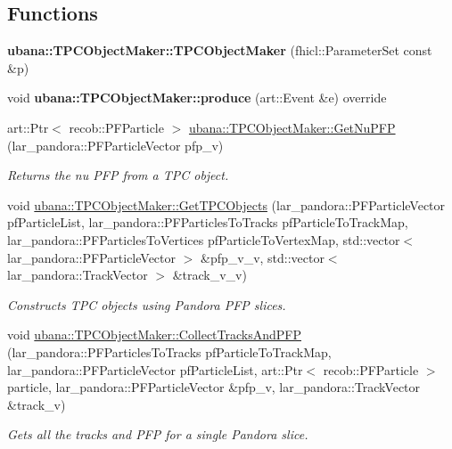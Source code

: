 \subsection*{Functions}
\begin{DoxyCompactItemize}
\item 
\hypertarget{group__UBXSec_gae030804e6aa4085bef6be52e9618fee9}{{\bfseries ubana\-::\-T\-P\-C\-Object\-Maker\-::\-T\-P\-C\-Object\-Maker} (fhicl\-::\-Parameter\-Set const \&p)}\label{group__UBXSec_gae030804e6aa4085bef6be52e9618fee9}

\item 
\hypertarget{group__UBXSec_ga07c03a811bbaccdbeb20b2b7714034c9}{void {\bfseries ubana\-::\-T\-P\-C\-Object\-Maker\-::produce} (art\-::\-Event \&e) override}\label{group__UBXSec_ga07c03a811bbaccdbeb20b2b7714034c9}

\item 
art\-::\-Ptr$<$ recob\-::\-P\-F\-Particle $>$ \hyperlink{group__UBXSec_ga6a47470b5f5690a3626e14bc9f6f360c}{ubana\-::\-T\-P\-C\-Object\-Maker\-::\-Get\-Nu\-P\-F\-P} (lar\-\_\-pandora\-::\-P\-F\-Particle\-Vector pfp\-\_\-v)
\begin{DoxyCompactList}\small\item\em Returns the nu P\-F\-P from a T\-P\-C object. \end{DoxyCompactList}\item 
void \hyperlink{group__UBXSec_gaf90fb2bf60601767e1db3bd1ca635433}{ubana\-::\-T\-P\-C\-Object\-Maker\-::\-Get\-T\-P\-C\-Objects} (lar\-\_\-pandora\-::\-P\-F\-Particle\-Vector pf\-Particle\-List, lar\-\_\-pandora\-::\-P\-F\-Particles\-To\-Tracks pf\-Particle\-To\-Track\-Map, lar\-\_\-pandora\-::\-P\-F\-Particles\-To\-Vertices pf\-Particle\-To\-Vertex\-Map, std\-::vector$<$ lar\-\_\-pandora\-::\-P\-F\-Particle\-Vector $>$ \&pfp\-\_\-v\-\_\-v, std\-::vector$<$ lar\-\_\-pandora\-::\-Track\-Vector $>$ \&track\-\_\-v\-\_\-v)
\begin{DoxyCompactList}\small\item\em Constructs T\-P\-C objects using Pandora P\-F\-P slices. \end{DoxyCompactList}\item 
void \hyperlink{group__UBXSec_ga39991fa551ce05bcb4fb10db4f80ab49}{ubana\-::\-T\-P\-C\-Object\-Maker\-::\-Collect\-Tracks\-And\-P\-F\-P} (lar\-\_\-pandora\-::\-P\-F\-Particles\-To\-Tracks pf\-Particle\-To\-Track\-Map, lar\-\_\-pandora\-::\-P\-F\-Particle\-Vector pf\-Particle\-List, art\-::\-Ptr$<$ recob\-::\-P\-F\-Particle $>$ particle, lar\-\_\-pandora\-::\-P\-F\-Particle\-Vector \&pfp\-\_\-v, lar\-\_\-pandora\-::\-Track\-Vector \&track\-\_\-v)
\begin{DoxyCompactList}\small\item\em Gets all the tracks and P\-F\-P for a single Pandora slice. \end{DoxyCompactList}\end{DoxyCompactItemize}



